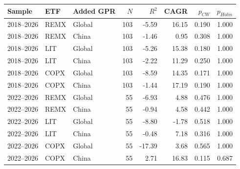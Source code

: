 \begin{tabular}{@{}lllrrrrr@{}}
\toprule
Sample & ETF & Added GPR & $N$ & $R^2$ & CAGR & $p_{CW}$ & $p_{Holm}$ \\
\midrule
2018–2026 & REMX & Global & 103 & -5.59 & 16.15 & 0.190 & 1.000 \\
2018–2026 & REMX & China & 103 & -1.46 & 0.95 & 0.308 & 1.000 \\
2018–2026 & LIT & Global & 103 & -5.26 & 15.38 & 0.180 & 1.000 \\
2018–2026 & LIT & China & 103 & -2.22 & 11.29 & 0.250 & 1.000 \\
2018–2026 & COPX & Global & 103 & -8.59 & 14.35 & 0.171 & 1.000 \\
2018–2026 & COPX & China & 103 & -1.44 & 17.19 & 0.190 & 1.000 \\
2022–2026 & REMX & Global & 55 & -6.93 & 4.88 & 0.476 & 1.000 \\
2022–2026 & REMX & China & 55 & -0.94 & 4.58 & 0.442 & 1.000 \\
2022–2026 & LIT & Global & 55 & -8.80 & -1.78 & 0.518 & 1.000 \\
2022–2026 & LIT & China & 55 & -0.48 & 7.18 & 0.316 & 1.000 \\
2022–2026 & COPX & Global & 55 & -17.39 & 3.68 & 0.565 & 1.000 \\
2022–2026 & COPX & China & 55 & 2.71 & 16.83 & 0.115 & 0.687 \\
\bottomrule
\end{tabular}